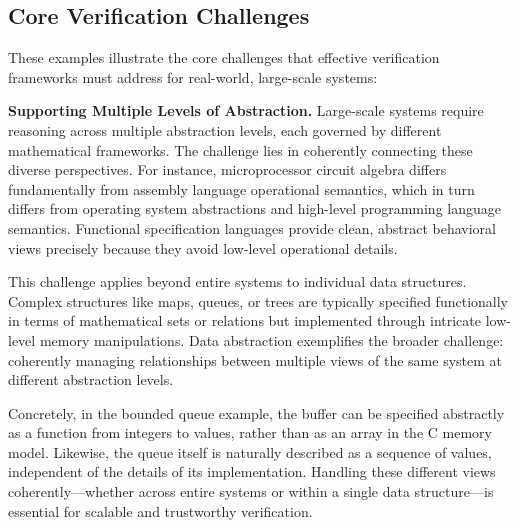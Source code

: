

\subsection{Core Verification Challenges}

These examples illustrate the core challenges
that effective verification frameworks must address
for real-world, large-scale systems:

\begin{challenge}
  \label{challenge:abstraction}
  \textbf{Supporting Multiple Levels of Abstraction.}
  Large-scale systems require reasoning
  across multiple abstraction levels,
  each governed by different mathematical frameworks.
  The challenge lies in coherently connecting
  these diverse perspectives.
  For instance,
  microprocessor circuit algebra
  differs fundamentally from
  assembly language operational semantics,
  which in turn differs from
  operating system abstractions
  and high-level programming language semantics.
  Functional specification languages
  provide clean, abstract behavioral views
  precisely because they avoid low-level operational details.

  This challenge applies beyond entire systems
  to individual data structures.
  Complex structures like maps, queues, or trees
  are typically specified functionally in terms of mathematical sets or relations
  but implemented through intricate low-level memory manipulations.
  Data abstraction exemplifies the broader challenge:
  coherently managing relationships
  between multiple views of the same system
  at different abstraction levels.

  Concretely,
  in the bounded queue example,
  the buffer can be specified abstractly
  as a function from integers to values,
  rather than as an array in the C memory model.
  Likewise, the queue itself is naturally described
  as a sequence of values,
  independent of the details of its implementation.
  Handling these different views coherently---whether across entire systems
  or within a single data structure---is essential for scalable and trustworthy verification.

\end{challenge}

